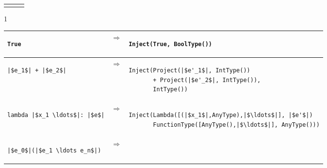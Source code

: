 \documentclass[7x10]{TimesAPriori_MIT}%
\def\pythonEd{1}
\def\edition{1}
\newcommand{\pythonColor}[0]{}
\numberwithin{theorem}{chapter}
\numberwithin{definition}{chapter}
\numberwithin{equation}{chapter}
\begin{document}
\begin{figure}[btp]
\begin{tcolorbox}[colback=white]
{\begin{tabular}{lll}
\begin{minipage}{0.65\textwidth}
\end{minipage}
\end{tabular} 
\fi}
{\if\edition\pythonEd\pythonColor
\hspace{-0.8em}\begin{tabular}{|lll|} \hline
\begin{minipage}{0.23\textwidth}
\begin{lstlisting}
True
\end{lstlisting}
\end{minipage}
&
$\Rightarrow$
&
\begin{minipage}{0.7\textwidth}
\begin{lstlisting}
Inject(True, BoolType())
\end{lstlisting}
\end{minipage}
\\[2ex]\hline
\begin{minipage}{0.23\textwidth}
\begin{lstlisting}
|$e_1$| + |$e_2$|
\end{lstlisting}
\end{minipage}
&
$\Rightarrow$
&
\begin{minipage}{0.7\textwidth}
\begin{lstlisting}
Inject(Project(|$e'_1$|, IntType())
       + Project(|$e'_2$|, IntType()),
       IntType())
\end{lstlisting}
\end{minipage}
\\[2ex]\hline
\begin{minipage}{0.23\textwidth}
\begin{lstlisting}
lambda |$x_1 \ldots$|: |$e$|
\end{lstlisting}
\end{minipage}
&
$\Rightarrow$
&
\begin{minipage}{0.7\textwidth}
\begin{lstlisting}
Inject(Lambda([(|$x_1$|,AnyType),|$\ldots$|], |$e'$|)
       FunctionType([AnyType(),|$\ldots$|], AnyType()))
\end{lstlisting}
\end{minipage}
\\[2ex]\hline
\begin{minipage}{0.23\textwidth}
\begin{lstlisting}
|$e_0$|(|$e_1 \ldots e_n$|)
\end{lstlisting}
\end{minipage}
&
$\Rightarrow$
&
\begin{minipage}{0.7\textwidth}
\begin{lstlisting}

\end{lstlisting}
\end{minipage}
\end{tabular}}
\end{tcolorbox}
\end{figure}
\end{document}
